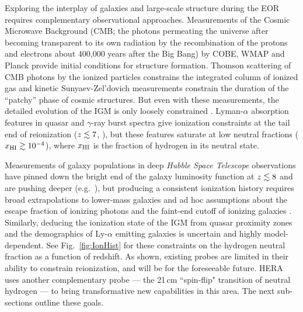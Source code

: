 \documentclass[preprint,11pt]{aastex}
\begin{document}
Exploring the interplay of galaxies and large-scale structure during the EOR
requires complementary observational approaches. Measurements of the Cosmic Microwave Background 
(CMB; the photons permeating the universe after becoming
transparent to its own radiation by the recombination of the protons and electrons about 400,000 years after the Big Bang)  by COBE, WMAP and Planck provide initial conditions for structure formation.  Thomson
scattering of CMB photons by the ionized particles constrains the integrated column of 
ionized gas and kinetic Sunyaev-Zel'dovich measurements constrain the duration of the ``patchy'' phase of cosmic structures.
But even with these measurements, the detailed evolution of the IGM 
is only loosely constrained \citep{haiman_holder2003,mortonson_hu2008,zahn_etal2012,mesinger_et_al2012}.
Lyman-$\alpha$ absorption features in quasar and $\gamma$-ray burst spectra give 
ionization constraints at the tail end of reionization 
($z\lesssim7$, \citealt{fan_et_al2006, mcgreer_et_al2015}), but these features 
saturate at low neutral fractions
($x_{\rm HI} \gtrsim 10^{-4}$), where $x_{\rm HI}$ is the fraction of hydrogen in its neutral state. 

Measurements of galaxy populations in
deep {\it Hubble Space Telescope} observations 
have pinned down the bright end of the galaxy luminosity function at $z \lesssim 8$
\citep{schenker_et_al2013, bouwens_et_al2015} and are pushing deeper
(e.g.~\citealt{mcleod_et_al2015}), but producing a consistent ionization history
requires broad extrapolations to
lower-mass galaxies and ad hoc assumptions about the escape fraction of
ionizing photons and the faint-end cutoff of ionizing galaxies
\citep{robertson_et_al2015, bouwens_et_al2015_reion}. 
Similarly, deducing the ionization state of the IGM from quasar proximity zones
\citep{carilli_et_al2010, bolton_et_al2011, bosman_becker2015} and the
demographics of Ly-$\alpha$ emitting galaxies \citep{fontana_et_al2010,
schenker_et_al2012, treu_et_al2012, dijkstra_et_al2014} is uncertain and
highly model-dependent.  See Fig.~\ref{fig:IonHist} for these constraints on the hydrogen neutral fraction as a function of redshift.
As shown, existing probes are limited in
their ability to constrain reionization, and will be for the foreseeable future.
HERA uses
another complementary probe --- the 21\,cm ``spin-flip" transition of neutral hydrogen
--- to bring transformative new capabilities in this area.  The next sub-sections outline these goals.
\end{document}
